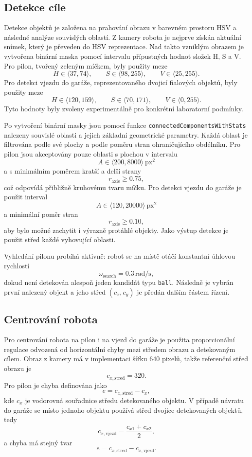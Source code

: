 \documentclass[a4paper,11pt]{article}
\begin{document}
\subsection{Detekce cíle}
Detekce objektů je založena na prahování obrazu v barevném prostoru HSV a následné analýze souvislých oblastí. Z kamery robota je nejprve získán aktuální snímek, který je převeden do HSV reprezentace. Nad takto vzniklým obrazem je vytvořena binární maska pomocí intervalu přípustných hodnot složek H, S a V. Pro pilon, tvořený zeleným míčkem, byly použity meze
\[
H \in \langle 37, 74 \rangle,\qquad
S \in \langle 98, 255 \rangle,\qquad
V \in \langle 25, 255 \rangle.
\]
Pro detekci vjezdu do garáže, reprezentovaného dvojicí fialových objektů, byly použity meze
\[
H \in \langle 120, 159 \rangle,\qquad
S \in \langle 70, 171 \rangle,\qquad
V \in \langle 0, 255 \rangle.
\]
Tyto hodnoty byly zvoleny experimentálně pro konkrétní laboratorní podmínky.

Po vytvoření binární masky jsou pomocí funkce \texttt{connectedComponentsWithStats} nalezeny souvislé oblasti a jejich základní geometrické parametry. Každá oblast je filtrována podle své plochy a podle poměru stran ohraničujícího obdélníku. Pro pilon jsou akceptovány pouze oblasti s plochou v intervalu
\[
A \in \langle 200, 8000 \rangle \ \mathrm{px}^2
\]
a s minimálním poměrem kratší a delší strany
\[
r_{\mathrm{axis}} \geq 0.75,
\]
což odpovídá přibližně kruhovému tvaru míčku. Pro detekci vjezdu do garáže je použit interval
\[
A \in \langle 120, 20000 \rangle \ \mathrm{px}^2
\]
a minimální poměr stran
\[
r_{\mathrm{axis}} \geq 0.10,
\]
aby bylo možné zachytit i výrazně protáhlé objekty. Jako výstup detekce je použit střed každé vyhovující oblasti.

Vyhledání pilonu probíhá aktivně: robot se na místě otáčí konstantní úhlovou rychlostí
\[
\omega_{\mathrm{search}} = 0.3\,\mathrm{rad/s},
\]
dokud není detekován alespoň jeden kandidát typu \texttt{ball}. Následně je vybrán první nalezený objekt a jeho střed $(c_x,c_y)$ je předán dalším částem řízení.

\subsection{Centrování robota}
Pro centrování robota na pilon i na vjezd do garáže je použita proporcionální regulace odvozená od horizontální chyby mezi středem obrazu a detekovaným cílem. Obraz z kamery má v implementaci šířku $640$ pixelů, takže referenční střed obrazu je
\[
c_{x,\mathrm{stred}} = 320.
\]
Pro pilon je chyba definována jako
\begin{equation}
  e = c_{x,\mathrm{stred}} - c_x,
\end{equation}
kde $c_x$ je vodorovná souřadnice středu detekovaného objektu. V případě návratu do garáže se místo jednoho objektu používá střed dvojice detekovaných objektů, tedy
\begin{equation}
  c_{x,\mathrm{vjezd}} = \frac{c_{x1}+c_{x2}}{2},
\end{equation}
a chyba má stejný tvar
\[
e = c_{x,\mathrm{stred}} - c_{x,\mathrm{vjezd}}.
\]
\end{document}
